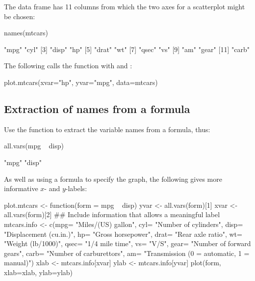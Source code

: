 \begin{marginfigure}
The data frame  has 11 columns from which
the two axes for a scatterplot might be chosen:

\begin{Schunk}
\begin{Sinput}
names(mtcars)
\end{Sinput}
\begin{Soutput}
 [1] "mpg"  "cyl" 
 [3] "disp" "hp"  
 [5] "drat" "wt"  
 [7] "qsec" "vs"  
 [9] "am"   "gear"
[11] "carb"
\end{Soutput}
\end{Schunk}

\end{marginfigure}

The following calls the function with  and
:
\begin{Schunk}
\begin{Sinput}
plot.mtcars(xvar="hp", yvar="mpg", data=mtcars)
\end{Sinput}
\end{Schunk}

\subsection{Extraction of names from a formula}

Use the function  to extract the variable names from
a formula, thus:
\begin{Schunk}
\begin{Sinput}
all.vars(mpg ~ disp)
\end{Sinput}
\begin{Soutput}
[1] "mpg"  "disp"
\end{Soutput}
\end{Schunk}

As well as using a formula to specify the graph, the following gives
more informative $x$- and $y$-labels:
\begin{fullwidth}
\begin{Schunk}
\begin{Sinput}
plot.mtcars <- function(form = mpg ~ disp){
   yvar <- all.vars(form)[1]
   xvar <- all.vars(form)[2]
   ## Include information that allows a meaningful label
   mtcars.info <-
     c(mpg= "Miles/(US) gallon",        cyl= "Number of cylinders",
       disp= "Displacement (cu.in.)",   hp= "Gross horsepower",
       drat= "Rear axle ratio",         wt= "Weight (lb/1000)",
       qsec= "1/4 mile time",           vs= "V/S",
       gear= "Number of forward gears",
       carb= "Number of carburettors",
       am= "Transmission (0 = automatic, 1 = manual)")
   xlab <- mtcars.info[xvar]
   ylab <- mtcars.info[yvar]
   plot(form, xlab=xlab, ylab=ylab)
}
\end{Sinput}
\end{Schunk}
\end{fullwidth}

